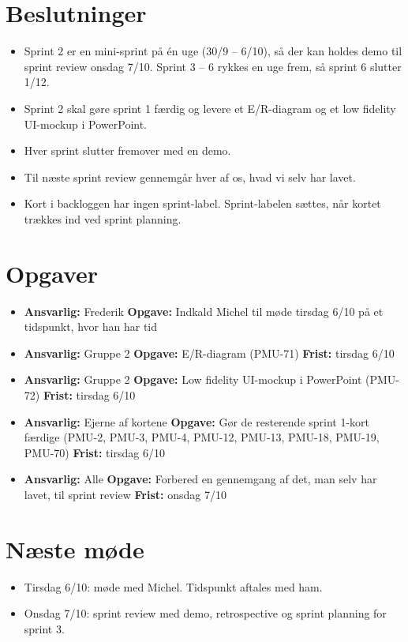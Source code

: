 \documentclass[a4paper,11pt]{article}
\begin{document}
\section*{Beslutninger}

\begin{itemize}
    \item Sprint 2 er en mini-sprint på én uge (30/9 -- 6/10), så der kan holdes demo til sprint review onsdag 7/10. Sprint 3 -- 6 rykkes en uge frem, så sprint 6 slutter 1/12.
    \item Sprint 2 skal gøre sprint 1 færdig og levere et E/R-diagram og et low fidelity UI-mockup i PowerPoint.
    \item Hver sprint slutter fremover med en demo.
    \item Til næste sprint review gennemgår hver af os, hvad vi selv har lavet.
    \item Kort i backloggen har ingen sprint-label. Sprint-labelen sættes, når kortet trækkes ind ved sprint planning.
\end{itemize}

\section*{Opgaver}

\begin{itemize}
    \item \textbf{Ansvarlig:} Frederik \textbf{Opgave:} Indkald Michel til møde tirsdag 6/10 på et tidspunkt, hvor han har tid
    \item \textbf{Ansvarlig:} Gruppe 2 \textbf{Opgave:} E/R-diagram (PMU-71) \textbf{Frist:} tirsdag 6/10
    \item \textbf{Ansvarlig:} Gruppe 2 \textbf{Opgave:} Low fidelity UI-mockup i PowerPoint (PMU-72) \textbf{Frist:} tirsdag 6/10
    \item \textbf{Ansvarlig:} Ejerne af kortene \textbf{Opgave:} Gør de resterende sprint 1-kort færdige (PMU-2, PMU-3, PMU-4, PMU-12, PMU-13, PMU-18, PMU-19, PMU-70) \textbf{Frist:} tirsdag 6/10
    \item \textbf{Ansvarlig:} Alle \textbf{Opgave:} Forbered en gennemgang af det, man selv har lavet, til sprint review \textbf{Frist:} onsdag 7/10
\end{itemize}

\section*{Næste møde}

\begin{itemize}
    \item Tirsdag 6/10: møde med Michel. Tidspunkt aftales med ham.
    \item Onsdag 7/10: sprint review med demo, retrospective og sprint planning for sprint 3.
\end{itemize}
\end{document}
